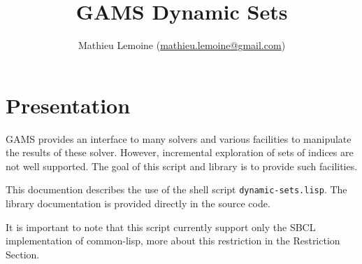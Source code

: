 \documentclass{article}
\newcommand{\mail}[1]{\href{mailto:#1}{#1}}
\begin{document}

\title{GAMS Dynamic Sets}

\author{Mathieu Lemoine (\mail{mathieu.lemoine@gmail.com})}

\maketitle

\section*{Presentation}

GAMS provides an interface to many solvers and various facilities to manipulate
the results of these solver. However, incremental exploration of sets of indices
are not well supported. The goal of this script and library is to provide such
facilities.

This documention describes the use of the shell script
\texttt{dynamic-sets.lisp}. The library documentation is provided directly in
the source code.

It is important to note that this script currently support only the SBCL
implementation of common-lisp, more about this restriction in the Restriction
Section.
\end{document}
